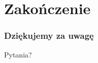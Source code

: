 \section{Zakończenie}

\begin{frame}
    \frametitle{Dziękujemy za uwagę}
    \begin{center}
        Pytania?
    \end{center}
\end{frame}


